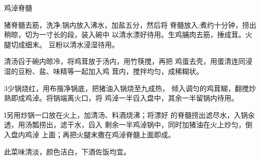 \begin{recipe}{鸡淖脊髓}

\ingredients


\cooking

\step 	猪脊髓去筋，洗净;锅内放入沸水，加盐五分，然后将 脊髓放入;煮约十分钟，捞出稍晾，切为一寸长的段，装入碗中 以清水漂好待用。生鸡脯肉去筋，捶成茸。火腿切成细末。 豆粉以清水浸湿待用。

\step 	清汤舀于碗内晾冷，将鸡茸放于汤内，用竹筷搅，再把 鸡蛋去壳，用蛋清连同浸湿的豆粉、盐、味精等一起加入鸡 茸内，搅拌均匀，成稀糊状。

\step 3少锅烧红，用布揩净锅底，把猪油入锅烧至九成热， 倾入调匀的鸡茸糊，翻搅炒熟即成鸡淖。将锅端离火口，将 鸡淖一半舀入盘中，其余一半留锅内待用。

I另用炒锅一口放在火上，加清汤、料酒烧沸；将漂好 的脊髓捞出滤尽水，入锅汆透，用汤瓢捞出，滤干水，舀入 剩余一半鸡淖锅中，同时加猪油在火上炒匀，倒入盘内鸡淖 上面；再把火腿末撒在鸡淖脊髓上面即成。

\notes

此菜味清淡，颜色洁白，下酒佐饭均宜。

\end{recipe}

